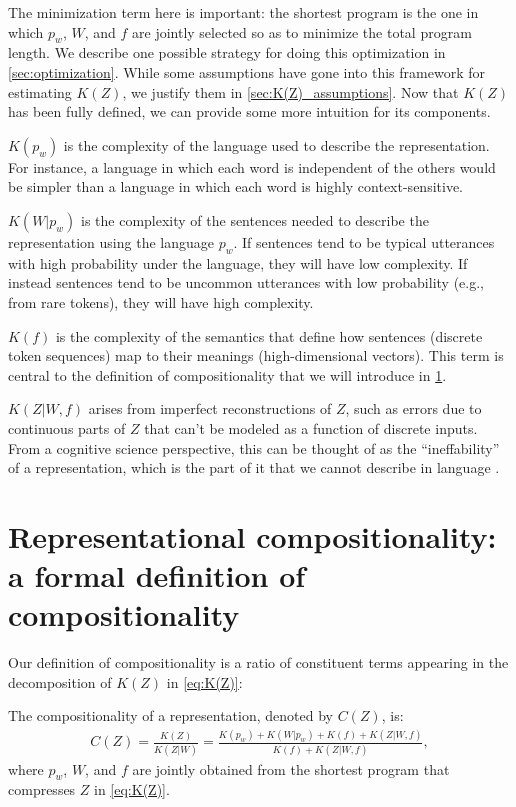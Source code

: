 \documentclass{article} %
\newcommand{\Comp}{Representational compositionality}
\begin{document}
The minimization term here is important: the shortest program is the one in which $p_w$, $W$, and $f$ are jointly selected so as to minimize the total program length. We describe one possible strategy for doing this optimization in \cref{sec:optimization}. While some assumptions have gone into this framework for estimating $K(Z)$, we justify them in \cref{sec:K(Z)_assumptions}. Now that $K(Z)$ has been fully defined, we can provide some more intuition for its components.

\underline{$K(p_w)$} is the complexity of the language used to describe the representation. For instance, a language in which each word is independent of the others would be simpler than a language in which each word is highly context-sensitive.

\underline{$K(W|p_w)$} is the complexity of the sentences needed to describe the representation using the language $p_w$. If sentences tend to be typical utterances with high probability under the language, they will have low complexity. If instead sentences tend to be uncommon utterances with low probability (e.g., from rare tokens), they will have high complexity.

\underline{$K(f)$} is the complexity of the semantics that define how sentences (discrete token sequences) map to their meanings (high-dimensional vectors). This term is central to the definition of compositionality that we will introduce in \cref{sec:compositionality}.

\underline{$K(Z|W,f)$} arises from imperfect reconstructions of $Z$, such as errors due to continuous parts of $Z$ that can’t be modeled as a function of discrete inputs. From a cognitive science perspective, this can be thought of as the ``ineffability'' of a representation, which is the part of it that we cannot describe in language .


\section{\Comp{}: a formal definition of compositionality}
\label{sec:compositionality}

Our definition of compositionality is a ratio of constituent terms appearing in the decomposition of $K(Z)$ in \cref{eq:K(Z)}: 

\begin{definition}[\Comp{}]
    \label{def:compositionality}
    The compositionality of a representation, denoted by $C(Z)$, is:
    \begin{align}
        \label{eq:C(Z)}
        C(Z) = \frac{K(Z)}{K(Z|W)} = \frac{K(p_w) + K(W|p_w) + K(f) + K(Z|W,f)}{K(f) + K(Z|W,f)} ,
    \end{align}
    where $p_w$, $W$, and $f$ are jointly obtained from the shortest program that compresses $Z$ in \cref{eq:K(Z)}.
\end{definition}
\end{document}
